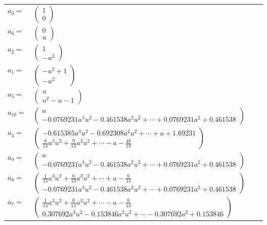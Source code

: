 \documentclass[1p]{elsarticle_modified}
\theoremstyle{definition}
\begin{document}
\begin{tabular}{m{7pt} m{180pt} m{7pt} m{180pt} }
\flushright $a_{3}=$&$\begin{pmatrix}1\\0\end{pmatrix}$ \\
\flushright $a_{6}=$&$\begin{pmatrix}0\\u\end{pmatrix}$ \\
\flushright $a_{2}=$&$\begin{pmatrix}1\\- u^2\end{pmatrix}$ \\
\flushright $a_{1}=$&$\begin{pmatrix}- u^2+1\\- u^2\end{pmatrix}$ \\
\flushright $a_{5}=$&$\begin{pmatrix}u\\u^2- u-1\end{pmatrix}$ \\
\flushright $a_{10}=$&$\begin{pmatrix}a\\-0.0769231 a^{3} u^{2}-0.461538 a^{2} u^{2}+\cdots+0.0769231 a^{2}+0.461538\end{pmatrix}$ \\
\flushright $a_{4}=$&$\begin{pmatrix}-0.615385 a^{3} u^{2}-0.692308 a^{2} u^{2}+\cdots+a+1.69231\\\frac{8}{13} a^3 u^2+\frac{9}{13} a^2 u^2+\cdots- a-\frac{48}{13}\end{pmatrix}$ \\
\flushright $a_{9}=$&$\begin{pmatrix}a\\-0.0769231 a^{3} u^{2}-0.461538 a^{2} u^{2}+\cdots+0.0769231 a^{2}+0.461538\end{pmatrix}$ \\
\flushright $a_{8}=$&$\begin{pmatrix}\frac{1}{13} a^3 u^2+\frac{6}{13} a^2 u^2+\cdots+a-\frac{6}{13}\\-0.0769231 a^{3} u^{2}-0.461538 a^{2} u^{2}+\cdots+0.0769231 a^{2}+0.461538\end{pmatrix}$ \\
\flushright $a_{7}=$&$\begin{pmatrix}\frac{1}{13} a^3 u^2+\frac{6}{13} a^2 u^2+\cdots- a-\frac{6}{13}\\0.307692 a^{3} u^{2}-0.153846 a^{2} u^{2}+\cdots-0.307692 a^{2}+0.153846\end{pmatrix}$ \\

\end{tabular}
\end{document}
